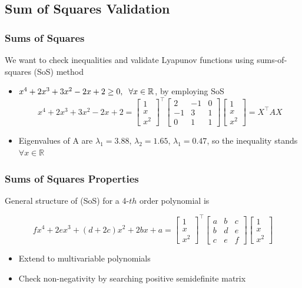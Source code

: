 \documentclass{beamer}
\begin{document}
\subsection{Sum of Squares Validation}
\begin{frame}
\frametitle{Sums of Squares}
We want to check inequalities and validate Lyapunov functions using sums-of-squares (SoS) method \cite{p3}\vspace{.2cm}
\begin{itemize}
\item $x^4+2x^3+3x^2-2x+2 \geq 0, \hspace{.2cm} \forall x \in \mathbb{R}$, by employing SoS
\begin{equation*}
x^4+2x^3+3x^2-2x+2= \begin{bmatrix}
1\\
x\\
x^2
\end{bmatrix}^{\intercal} \begin{bmatrix}
2 & -1 & 0\\
-1 & 3 & 1\\
0 & 1 & 1
\end{bmatrix} \begin{bmatrix}
1\\
x\\
x^2
\end{bmatrix} = X^{\intercal}AX
\end{equation*}
\item Eigenvalues of A are $\lambda_1=3.88$, $\lambda_2=1.65$, $\lambda_1=0.47$, so the inequality stands $\forall x \in \mathbb{R}$
\end{itemize}

\end{frame}


\begin{frame}
\frametitle{Sums of Squares Properties}
General structure of (SoS) for a 4-$th$ order polynomial is \vspace{.2cm}

\begin{equation*}
fx^4+2ex^3+(d+2c)x^2+2bx+a= \begin{bmatrix}
1\\
x\\
x^2
\end{bmatrix}^{\intercal} \begin{bmatrix}
a & b & c\\
b & d & e\\
c & e & f
\end{bmatrix} \begin{bmatrix}
1\\
x\\
x^2
\end{bmatrix}
\end{equation*}

\begin{itemize}
\item Extend to multivariable polynomials
\item Check non-negativity by searching positive semidefinite matrix
\end{itemize}
\end{frame}
\end{document}
